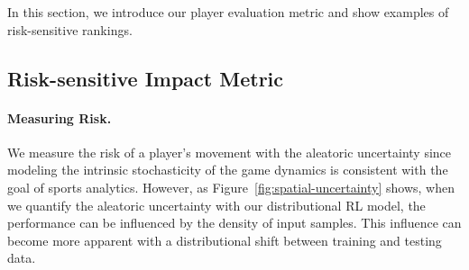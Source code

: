 \documentclass{article}
\begin{document}
In this section, we introduce our player evaluation metric and show examples of risk-sensitive rankings.

\subsection{Risk-sensitive Impact Metric}\label{subsec:evaluation-metric}
\paragraph{Measuring Risk.} We measure the risk of a player's movement with the aleatoric uncertainty since modeling the intrinsic stochasticity of the game dynamics is consistent with the goal of sports analytics.
However, as Figure~\ref{fig:spatial-uncertainty} shows, when we quantify the aleatoric uncertainty with our distributional RL model, the performance can be influenced by the density of input samples. This influence can become more apparent with a distributional shift between training and testing data.
\vspace{-0.15in}
\end{document}
